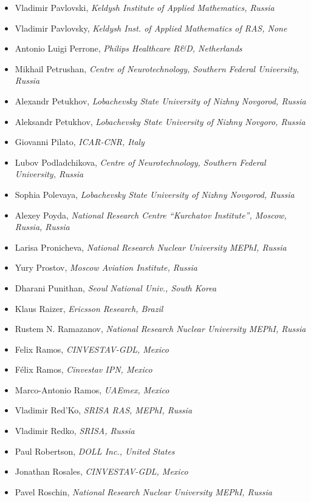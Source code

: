 \documentclass[10pt,fleqn,openany]{book} %
\begin{document}
\begin{itemize}
		\item Vladimir Pavlovski, \textit{Keldysh Institute of Applied Mathematics, Russia}
		\item Vladimir Pavlovsky, \textit{Keldysh Inst. of Applied Mathematics of RAS, None}
		\item Antonio Luigi Perrone, \textit{Philips Healthcare R\&D, Netherlands}
		\item Mikhail Petrushan, \textit{Centre of Neurotechnology, Southern Federal University, Russia}
		\item Alexandr Petukhov, \textit{Lobachevsky State University of Nizhny Novgorod, Russia}
		\item Aleksandr Petukhov, \textit{Lobachevsky State University of Nizhny Novgoro, Russia}
		\item Giovanni Pilato, \textit{ICAR-CNR, Italy}
		\item Lubov Podladchikova, \textit{Centre of Neurotechnology, Southern Federal University, Russia}
		\item Sophia Polevaya, \textit{Lobachevsky State University of Nizhny Novgorod, Russia}
		\item Alexey Poyda, \textit{National Research Centre ``Kurchatov Institute'', Moscow, Russia, Russia}
		\item Larisa Pronicheva, \textit{National Research Nuclear University MEPhI, Russia}
		\item Yury Prostov, \textit{Moscow Aviation Institute, Russia}
		\item Dharani Punithan, \textit{Seoul National Univ., South Korea}
		\item Klaus Raizer, \textit{Ericsson Research, Brazil}
		\item Rustem N. Ramazanov, \textit{National Research Nuclear University MEPhI, Russia}
		\item Felix Ramos, \textit{CINVESTAV-GDL, Mexico}
		\item Félix Ramos, \textit{Cinvestav IPN, Mexico}
		\item Marco-Antonio Ramos, \textit{UAEmex, Mexico}
		\item Vladimir Red'Ko, \textit{SRISA RAS, MEPhI, Russia}
		\item Vladimir Redko, \textit{SRISA, Russia}
		\item Paul Robertson, \textit{DOLL Inc., United States}
		\item Jonathan Rosales, \textit{CINVESTAV-GDL, Mexico}
		\item Pavel Roschin, \textit{National Research Nuclear University MEPhI, Russia}

\end{itemize}
\end{document}

